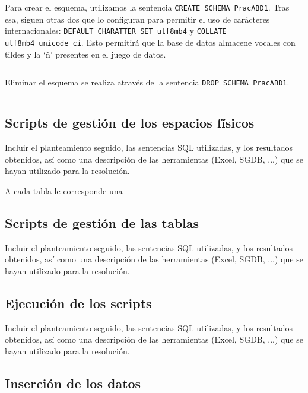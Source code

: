 \documentclass[a4paper, 11pt, oneside]{article} %
\newcommand{\scriptdir}{../scripts/} %
\begin{document}
Para crear el esquema, utilizamos la sentencia \texttt{CREATE SCHEMA PracABD1}. Tras esa, siguen otras dos que lo configuran para permitir el uso de carácteres internacionales: \texttt{DEFAULT CHARATTER SET utf8mb4} y \texttt{COLLATE utf8mb4_unicode_ci}. Esto permitirá que la base de datos almacene vocales con tildes y la `ñ' presentes en el juego de datos.\\

\inputminted{mysql}{\scriptdir creator.sql}

Eliminar el esquema se realiza através de la sentencia \texttt{DROP SCHEMA PracABD1}.\\

\inputminted{mysql}{\scriptdir dropper.sql}

\subsection{Scripts de gestión de los espacios físicos}

Incluir el planteamiento seguido, las sentencias SQL utilizadas, y los resultados obtenidos, así como una descripción de las herramientas (Excel, SGDB, ...) que se hayan utilizado para la resolución.

A cada tabla le corresponde una

\subsection{Scripts de gestión de las tablas}

Incluir el planteamiento seguido, las sentencias SQL utilizadas, y los resultados obtenidos, así como una descripción de las herramientas (Excel, SGDB, ...) que se hayan utilizado para la resolución.

\subsection{Ejecución de los scripts}

Incluir el planteamiento seguido, las sentencias SQL utilizadas, y los resultados obtenidos, así como una descripción de las herramientas (Excel, SGDB, ...) que se hayan utilizado para la resolución.

\subsection{Inserción de los datos}
\end{document}
